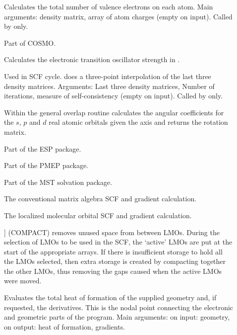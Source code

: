 \begin{description}
\item[] Calculates the total number of valence electrons on
each atom. Main arguments: density matrix, array of atom charges (empty on
input). Called by  only.

\item[] Part of COSMO.

\item[] Calculates the electronic transition oscillator strength
in  .

\item[] Used in SCF cycle.  does a three-point
interpolation of the last three density matrices.  Arguments: Last three
density matrices, Number of iterations, measure of self-consistency (empty on
input). Called by  only.

\item[] Within the general overlap routine  calculates  the
angular coefficients for the $s$, $p$ and $d$ real atomic orbitals given the
axis and returns the rotation matrix.

\item[] Part of the ESP package.

\item[] Part of the PMEP package.

\item[] Part of the MST solvation package.

\item[] The conventional matrix algebra SCF and gradient
calculation.

\item[] The localized molecular orbital SCF and gradient
calculation.

\item[]] (COMPACT) removes unused space from between LMOs. During
the selection of LMOs to be used in the SCF, the `active' LMOs are put at the
start of the appropriate arrays.  If there is insufficient storage to hold all
the LMOs selected, then extra storage is created by compacting together the
other LMOs, thus removing the gaps caused when the active LMOs were moved.

\item[] Evaluates the total heat of formation of the supplied
geometry and, if requested,  the derivatives. This is the nodal point
connecting the electronic and geometric parts of the program. Main arguments:
on input: geometry, on output: heat of formation, gradients.


\end{description}
